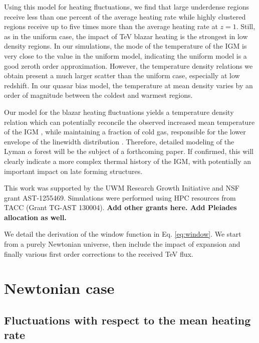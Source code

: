 \documentclass[twocolumns]{emulateapj}
\newcommand\ALc[1]{{\color{red} \bf #1}} %
\begin{document}
{{Using this model for heating fluctuations, we find that large underdense regions receive less than one percent of the average heating rate while highly clustered regions receive up to five times more than the average heating rate at $z=1$. Still, as in the uniform case, the impact of TeV blazar heating is the strongest in low density regions. In our simulations, the mode of the temperature of the IGM is very close to the value in the uniform model, indicating the uniform model is a good zeroth order approximation. However, the temperature density relations we obtain present a much larger scatter than the uniform case, especially at low redshift. In our quasar bias model, the temperature at mean density varies by an order of magnitude between the coldest and warmest regions. 

Our model for the blazar heating fluctuations yields a temperature density relation which can potentially reconcile the observed increased mean temperature of the IGM \citep{2014MNRAS.441.1916B}, while maintaining a fraction of cold gas, responsible for the lower envelope of the linewidth distribution \citep{2012ApJ...757L..30R}. Therefore, detailed modeling of the Lyman $\alpha$ forest will be the subject of a forthcoming paper. If confirmed, this will clearly indicate a more complex  thermal history of the IGM, with potentially an important impact on late forming structures. 

}

\begin{acknowledgements}
This work was supported by the UWM Research Growth Initiative and NSF grant AST-1255469. Simulations were performed using HPC resources from TACC (Grant TG-AST 130004). \ALc{Add other grants here. Add Pleiades allocation as well.}
\end{acknowledgements}


\appendix

We detail the derivation of the window function in Eq. \ref{eq:window}. We start from a purely Newtonian universe, then include the impact of expansion and finally various first order corrections to the received TeV flux.
\section {Newtonian case}\label{sec:windon_newt}

\subsection {Fluctuations with respect to the mean heating rate}

}
\end{document}
